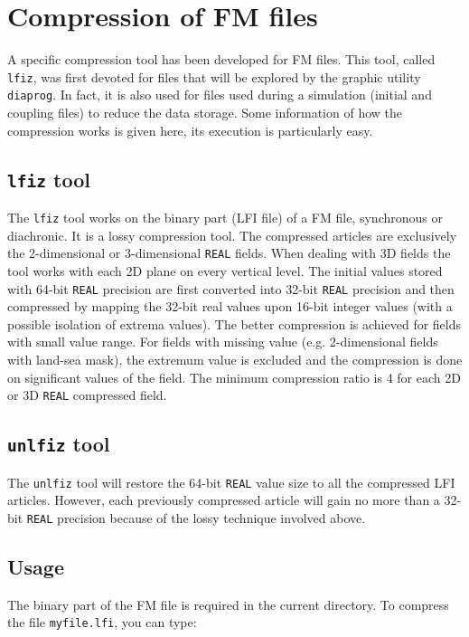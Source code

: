 \section{Compression of FM files} 

A specific compression tool has been developed for FM files.  This
tool, called {\tt lfiz}, was first devoted for files that will be
explored by the graphic utility {\tt diaprog}. In fact, it is also
used for files used during a simulation (initial and coupling files)
to reduce the data storage.  Some information of how the compression
works is given here, its execution is particularly easy.

\subsection{{\tt lfiz} tool}

The \texttt{lfiz} tool works on the binary part (LFI file) of a FM
file, synchronous or diachronic.  It is a lossy compression tool.
The compressed articles are exclusively the 2-dimensional or
3-dimensional \texttt{REAL} fields. When dealing with 3D fields the tool works
with each 2D plane on every vertical level. The initial values stored
with 64-bit \texttt{REAL} precision are first converted into 32-bit
\texttt{REAL} precision and then compressed by mapping the 32-bit
real values upon 16-bit integer values (with a possible isolation of
extrema values).  The better compression is
achieved for fields with small value range.  For fields with missing
value (e.g.  2-dimensional fields with land-sea mask), the extremum
value is excluded and the compression is done on significant values of
the field. The minimum compression ratio is 4 for each 2D or 3D
\texttt{REAL} compressed field.

\subsection{{\tt unlfiz} tool}
The \texttt{unlfiz} tool will restore the 64-bit \texttt{REAL} value size to all
the compressed LFI articles. However, each previously compressed article
will gain no more than a 32-bit \texttt{REAL} precision because of the lossy
technique involved above.


\subsection{Usage}
The binary part of the FM file is required in the current
directory. To compress the file \texttt{myfile.lfi}, you can type:

